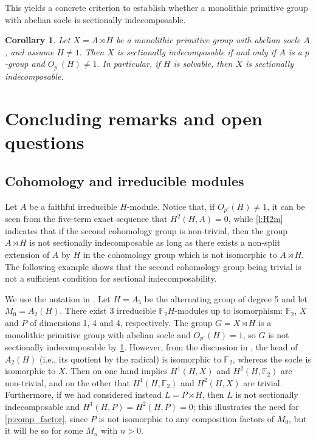 \documentclass[10pt,a4paper]{amsart}
\newtheorem{corollary}[thm]{Corollary}
\begin{document}
This yields a concrete criterion to establish whether a monolithic primitive group with abelian socle is sectionally indecomposable.

\begin{corollary}\label{c:strong_indec_o-p'}
Let $X=A\rtimes H$ be a monolithic primitive group with abelian socle $A$, and assume $H\neq 1.$ Then $X$ is sectionally indecomposable if and only if $A$ is a $p$-group and $O_{p^\prime}(H)\neq 1.$ In particular, if $H$ is solvable, then $X$ is sectionally indecomposable.
\end{corollary}


\section{Concluding remarks and open questions}\label{sec:final}

\subsection{Cohomology and irreducible modules}
Let $A$ be a faithful irreducible $H$-module. Notice that, if $O_{p'}(H) \neq 1$, it can be seen from the five-term exact sequence that $H^2(H,A)=0$, while \cref{l:H2m} indicates that if the second cohomology group is non-trivial, then the group $A \rtimes H$ is not sectionally indecomposable as long as there exists a non-split extension of $A$ by $H$ in the cohomology group which is not isomorphic to $A \rtimes H$. The following example shows that the second cohomology group being trivial is not a sufficient condition for sectional indecomposability.

We use the notation in \cite[Example 1]{GS78}. Let $H=A_5$ be the alternating group of degree 5 and let $M_0=A_2(H)$. There exist 3 irreducible $\mathbb F_2 H$-modules up to isomorphism: $\mathbb F_2$, $X$ and $P$ of dimensions 1, 4 and 4, respectively. The group $G=X \rtimes H$ is a monolithic primitive group with abelian socle and $O_{p'}(H)=1$, so $G$ is not sectionally indecomposable by \cref{c:strong_indec_o-p'}. However, from the discussion in \cite[Example 1]{GS78}, the head of $A_2(H)$ (i.e., its quotient by the radical) is isomorphic to $\mathbb F_2$, whereas the socle is isomorphic to $X$. Then \cite[Lemma 3]{GS78} on one hand implies $H^1(H,X)$ and $H^2(H,\mathbb F_2)$ are non-trivial, and on the other that $H^1(H,\mathbb F_2)$ and $H^2(H,X)$ are trivial. Furthermore, if we had considered instead $L=P \rtimes H$, then $L$ is not sectionally indecomposable and $H^1(H,P) = H^2(H,P)=0$; this illustrates the need for \cref{p:comp_factor}, since $P$ is not isomorphic to any composition factors of $M_0$, but it will be so for some $M_n$ with $n> 0$.
\end{document}
